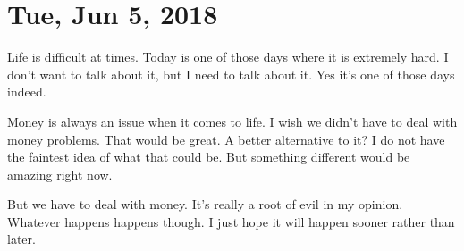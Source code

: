 \section{Tue, Jun 5, 2018}

Life is difficult at times. Today is one of those days where it is extremely
hard. I don't want to talk about it, but I need to talk about it. Yes it's one
of those days indeed.

Money is always an issue when it comes to life. I wish we didn't have to deal
with money problems. That would be great. A better alternative to it? I do not
have the faintest idea of what that could be. But something different would be
amazing right now.

But we have to deal with money. It's really a root of evil in my opinion.
Whatever happens happens though. I just hope it will happen sooner rather than
later.